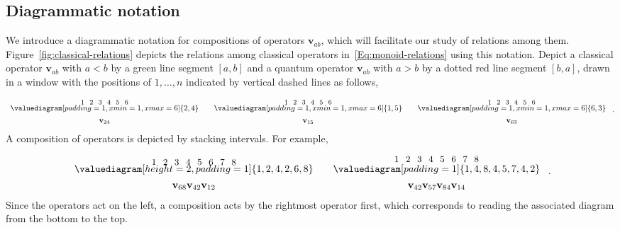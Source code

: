 \documentclass[12pt,oneside,reqno]{amsart}
\theoremstyle{definition}
\numberwithin{equation}{section}
\newcommand{\qv}{{\mathbf v}}
\newcommand{\defcolor}[1]{{\color{RoyalBlue}#1}}
\begin{document}
\subsection{Diagrammatic notation}
\label{SS:diagrammatic-notation}
We introduce a \defcolor{diagrammatic notation} for compositions of operators $\qv_{ab}$, which  will facilitate our study of relations
among them.
Figure~\ref{fig:classical-relations} depicts the relations among classical operators in~\eqref{Eq:monoid-relations} using this notation.
Depict a classical operator $\qv_{ab}$ with $a<b$ by a green line segment $[a,b]$
and a quantum operator $\qv_{ab}$ with $a>b$ by a dotted red line segment $[b,a]$,
drawn in a window with the positions of $1,\dotsc,n$ indicated by vertical
dashed lines as follows,
\newcommand{\labelhack}{\begin{picture}(62,2)
   \put(0 ,-4){{\small 1}}\put(11.5,-4){{\small 2}}
   \put(23,-4){{\small 3}}\put(34.5,-4){{\small 4}}
   \put(46,-4){{\small 5}}\put(57.5,-4){{\small 6}}\end{picture}}
\[
\begin{array}{c@{\qquad}c@{\qquad}c}
    \labelhack& \labelhack& \labelhack   \\
    \valuediagram[padding=1, xmin=1, xmax=6]{{2,4}}
    &
    \valuediagram[padding=1, xmin=1, xmax=6]{{1,5}}
    &
    \valuediagram[padding=1, xmin=1, xmax=6]{{6,3}}
    \\[1ex]
    \qv_{24} & \qv_{15} & \qv_{63}
\end{array}\ .
\]
A composition of operators is depicted by stacking intervals.
For example,
\newcommand{\llabelhack}{\begin{picture}(85,2)
   \put(0 ,-4){{\small 1}}\put(11.5,-4){{\small 2}}
   \put(23,-4){{\small 3}}\put(34.5,-4){{\small 4}}
   \put(46,-4){{\small 5}}\put(57.5,-4){{\small 6}}
   \put(69,-4){{\small 7}}\put(80.5,-4){{\small 8}}\end{picture}}
\[
    \begin{array}{c@{\qquad}c}
    \raisebox{-1pt}{\llabelhack} & \raisebox{2pt}{\llabelhack} \\
     \valuediagram[height=2, padding=1]{{1,2},{4,2},{6,8}}
    &
     \valuediagram[padding=1]{{1,4},{8,4},{5,7},{4,2}}
     \\[1ex]
    \qv_{68}\qv_{42}\qv_{12} & \qv_{42}\qv_{57}\qv_{84}\qv_{14}
  \end{array}\ .
\]
Since the operators act on the left, a composition acts by the rightmost
operator first, which corresponds to reading the associated diagram from the
bottom to the top.
\end{document}
